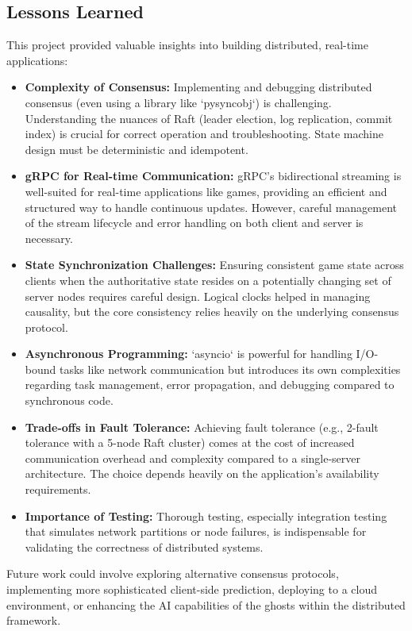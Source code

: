 \documentclass[11pt]{article}
\begin{document}
\subsection{Lessons Learned}
This project provided valuable insights into building distributed, real-time applications:
\begin{itemize}
    \item \textbf{Complexity of Consensus:} Implementing and debugging distributed consensus (even using a library like `pysyncobj`) is challenging. Understanding the nuances of Raft (leader election, log replication, commit index) is crucial for correct operation and troubleshooting. State machine design must be deterministic and idempotent.
    \item \textbf{gRPC for Real-time Communication:} gRPC's bidirectional streaming is well-suited for real-time applications like games, providing an efficient and structured way to handle continuous updates. However, careful management of the stream lifecycle and error handling on both client and server is necessary.
    \item \textbf{State Synchronization Challenges:} Ensuring consistent game state across clients when the authoritative state resides on a potentially changing set of server nodes requires careful design. Logical clocks helped in managing causality, but the core consistency relies heavily on the underlying consensus protocol.
    \item \textbf{Asynchronous Programming:} `asyncio` is powerful for handling I/O-bound tasks like network communication but introduces its own complexities regarding task management, error propagation, and debugging compared to synchronous code.
    \item \textbf{Trade-offs in Fault Tolerance:} Achieving fault tolerance (e.g., 2-fault tolerance with a 5-node Raft cluster) comes at the cost of increased communication overhead and complexity compared to a single-server architecture. The choice depends heavily on the application's availability requirements.
    \item \textbf{Importance of Testing:} Thorough testing, especially integration testing that simulates network partitions or node failures, is indispensable for validating the correctness of distributed systems.
\end{itemize}
Future work could involve exploring alternative consensus protocols, implementing more sophisticated client-side prediction, deploying to a cloud environment, or enhancing the AI capabilities of the ghosts within the distributed framework.
\end{document}
